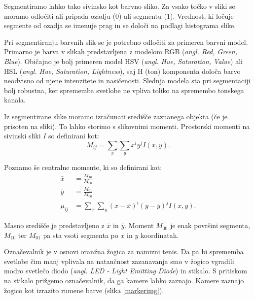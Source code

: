\documentclass[a4paper, 12pt]{book}
\begin{document}
Segmentiramo lahko tako sivinsko kot barvno sliko. Za vsako točko v sliki se moramo odločiti ali pripada ozadju (0) ali segmentu (1). Vrednost, ki ločuje segmente od ozadja se imenuje prag in se določi na podlagi histograma slike.

Pri segmentiranju barvnih slik se je potrebno odločiti za primeren barvni model. Primarno je barva v slikah predstavljena z modelom RGB (\emph{angl. Red, Green, Blue}). Običajno je bolj primeren model HSV (\emph{angl. Hue, Saturation, Value}) ali HSL (\emph{angl. Hue, Saturation, Lightness}), saj H (ton) komponenta določa barvo neodvisno od njene intenzitete in nasičenosti. Slednja modela sta pri segmentaciji bolj robustna, ker sprememba svetlobe ne vpliva toliko na spremembo tonskega kanala.

Iz segmentirane slike moramo izračunati središče zaznanega objekta (če je prisoten na sliki). To lahko storimo s slikovnimi momenti. Prostorski momenti na sivinski sliki $I$ so definirani kot:
\begin{equation}
M_{ij} = \sum_x \sum_y x^i y^j I(x, y).
\end{equation}

Poznamo še centralne momente, ki so definirani kot:
\begin{align}
\bar{x} &= \frac{M_{10}}{M_{00}} \\
\bar{y} &= \frac{M_{01}}{M_{00}} \\
\mu_{ij} &= \sum_x \sum_y (x - \bar{x})^i (y - \bar{y})^j I(x, y).
\end{align}

Masno središče je predstavljeno z $\bar{x}$ in $\bar{y}$. Moment $M_{00}$ je enak površini segmenta, $M_{10}$ ter $M_{01}$ pa sta vsoti segmenta po $x$ in $y$ koordinatah.

Označevalnik je v osnovi oranžna žogica za namizni tenis. Da pa bi sprememba svetlobe čim manj vplivala na natančnost zazanavanja smo v žogico vgradili modro svetlečo diodo (\emph{angl. LED - Light Emitting Diode}) in stikalo. S pritiskom na stikalo prižgemo označevalnik, da ga kamere lahko zaznajo. Kamere zaznajo žogico kot izrazito rumene barve (slika \ref{markerimg}).
\end{document}
